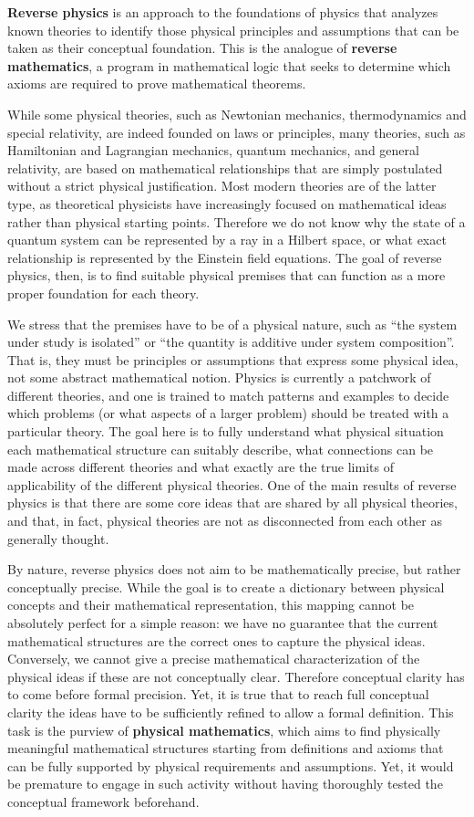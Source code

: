 \textbf{Reverse physics} is an approach to the foundations of physics that analyzes known theories to identify those physical principles and assumptions that can be taken as their conceptual foundation. This is the analogue of \textbf{reverse mathematics}, a program in mathematical logic that seeks to determine which axioms are required to prove mathematical theorems.

While some physical theories, such as Newtonian mechanics, thermodynamics and special relativity, are indeed founded on laws or principles, many theories, such as Hamiltonian and Lagrangian mechanics, quantum mechanics, and general relativity, are based on mathematical relationships that are simply postulated without a strict physical justification. Most modern theories are of the latter type, as theoretical physicists have increasingly focused on mathematical ideas rather than physical starting points. Therefore we do not know why the state of a quantum system can be represented by a ray in a Hilbert space, or what exact relationship is represented by the Einstein field equations. The goal of reverse physics, then, is to find suitable physical premises that can function as a more proper foundation for each theory.

We stress that the premises have to be of a physical nature, such as ``the system under study is isolated'' or ``the quantity is additive under system composition''. That is, they must be principles or assumptions that express some physical idea, not some abstract mathematical notion. Physics is currently a patchwork of different theories, and one is trained to match patterns and examples to decide which problems (or what aspects of a larger problem) should be treated with a particular theory. The goal here is to fully understand what physical situation each mathematical structure can suitably describe, what connections can be made across different theories and what exactly are the true limits of applicability of the different physical theories. One of the main results of reverse physics is that there are some core ideas that are shared by all physical theories, and that, in fact, physical theories are not as disconnected from each other as generally thought.

By nature, reverse physics does not aim to be mathematically precise, but rather conceptually precise. While the goal is to create a dictionary between physical concepts and their mathematical representation, this mapping cannot be absolutely perfect for a simple reason: we have no guarantee that the current mathematical structures are the correct ones to capture the physical ideas. Conversely, we cannot give a precise mathematical characterization of the physical ideas if these are not conceptually clear. Therefore conceptual clarity has to come before formal precision. Yet, it is true that to reach full conceptual clarity the ideas have to be sufficiently refined to allow a formal definition. This task is the purview of \textbf{physical mathematics}, which aims to find physically meaningful mathematical structures starting from definitions and axioms that can be fully supported by physical requirements and assumptions. Yet, it would be premature to engage in such activity without having thoroughly tested the conceptual framework beforehand.
